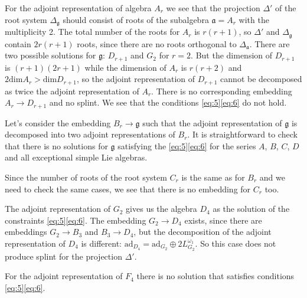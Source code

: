 \documentclass[12pt]{article}
\newcommand{\gf}{\mathfrak{g}}
\newcommand{\af}{\mathfrak{a}}
\begin{document}

For the adjoint representation of algebra $A_{r}$ we see that the projection $\Delta'$ of the root system
$\Delta_{\gf}$ should consist of roots of the subalgebra $\af=A_{r}$ with the multiplicity 2. The total
number of the roots for $A_{r}$ is $r(r+1)$, so $\Delta'$ and $\Delta_{\gf}$ contain $2r(r+1)$ roots,
since there are no roots orthogonal to $\Delta_{\af}$. There are two possible solutions for
$\gf$: $D_{r+1}$ and $G_{2}$ for $r=2$. But the dimension of $D_{r+1}$ is $(r+1)(2r+1)$ while the
dimension of $A_{r}$ is $r(r+2)$ and $2\mathrm{dim}A_{r}>\mathrm{dim}D_{r+1}$, so the adjoint
representation of $D_{r+1}$ cannot be decomposed as twice the adjoint representation of $A_{r}$.
There is no corresponding embedding $A_{r}\to D_{r+1}$ and no splint. We see that the conditions
\ref{eq:5}\ref{eq:6} do not hold. 

Let's consider the embedding $B_{r}\to \gf$ such that the adjoint representation of $\gf$ is
decomposed into two adjoint representations of $B_{r}$. It is straightforward to check that there is
no solutions for $\gf$ satisfying the \ref{eq:5}\ref{eq:6} for the series $A$, $B$, $C$,
$D$ and all exceptional simple Lie algebras. 

Since the number of roots of the root system $C_{r}$ is the same as for $B_{r}$ and we need to check the
same cases, we see that there is no embedding for $C_{r}$ too. 

The adjoint representation of $G_{2}$ gives us the algebra $D_{4}$ as the solution of the
constraints \ref{eq:5}\ref{eq:6}. The embedding $G_{2}\to D_{4}$ exists, since there are
embeddings $G_{2}\to B_{3}$ and $B_{3}\to D_{4}$, but the decomposition of the adjoint representation of
$D_{4}$ is different: $ \mathrm{ad}_{D_{4}}=\mathrm{ad}_{G_{2}}\oplus 2 L^{\omega_{1}}_{G_{2}}$. So
this case does not produce splint for the projection $\Delta'$. 

For the adjoint representation of $F_{4}$ there is no solution that satisfies conditions
\ref{eq:5}\ref{eq:6}. 
\end{document}
